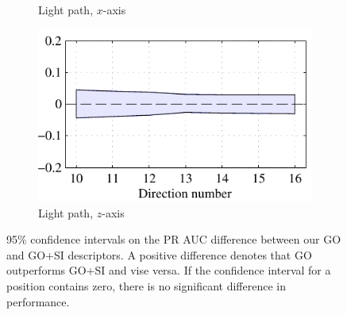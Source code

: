 \documentclass[thesis.tex]{subfiles}
\begin{document}
\begin{figure}[tb]
{\begin{subfigure}[t]{0.6242\textwidth}
		\caption{Light path, $x$-axis}
	\end{subfigure}
	\begin{subfigure}[t]{0.5618\textwidth}
		\includegraphics[width=\textwidth]{img/dtuResultsStatsGo_GoSi_6.pdf}
		\caption{Light path, $z$-axis}
	\end{subfigure}
	}
	\caption{95\% confidence intervals on the PR AUC difference between our GO and GO+SI descriptors. A positive difference denotes that GO outperforms GO+SI and vise versa. If the confidence interval for a position contains zero, there is no significant difference in performance.}
	\label{fig:dtuResultsStatsGo_GoSi}
\end{figure}
\end{document}
